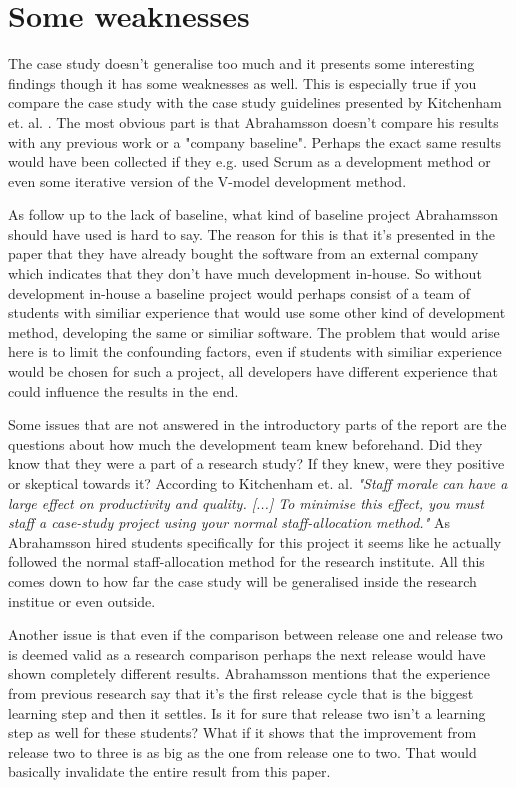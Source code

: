 \section{Some weaknesses}
The case study doesn't generalise too much and it presents some interesting
findings though it has some weaknesses as well. This is especially true if you
compare the case study with the case study guidelines presented by Kitchenham
et. al. \cite{kitchenham1995}. The most obvious part is that Abrahamsson
doesn't compare his results with any previous work or a "company baseline".
Perhaps the exact same results would have been collected if they e.g. used
Scrum as a development method or even some iterative version of the V-model
development method.

As follow up to the lack of baseline, what kind of baseline project Abrahamsson should
have used is hard to say. The reason for this is that it's presented in the
paper that they have already bought the software from an external company which
indicates that they don't have much development in-house. So without
development in-house a baseline project would perhaps consist of a team of
students with similiar experience that would use some other kind of development
method, developing the same or similiar software. The problem that would arise here is
to limit the confounding factors, even if students with similiar experience
would be chosen for such a project, all developers have different experience
that could influence the results in the end.

Some issues that are not answered in the introductory parts of the report are
the questions about how much the development team knew beforehand. Did they
know that they were a part of a research study? If they knew, were they
positive or skeptical towards it? According to Kitchenham et. al. {\em "Staff
    morale can have a large effect on productivity and quality. [...] To
    minimise this effect, you must staff a case-study project using your normal
staff-allocation method."} As Abrahamsson hired students specifically for this
project it seems like he actually followed the normal staff-allocation method
for the research institute. All this comes down to how far the case study will
be generalised inside the research institue or even outside.

Another issue is that even if the comparison between release one and release two is deemed valid as a
research comparison perhaps the next release would have shown completely
different results. Abrahamsson mentions that the experience from previous
research say that it's the first release cycle that is the biggest learning step
and then it settles. Is it for sure that release two isn't a learning step as
well for these students? What if it shows that the improvement from release two
to three is as big as the one from release one to two. That would basically
invalidate the entire result from this paper.

